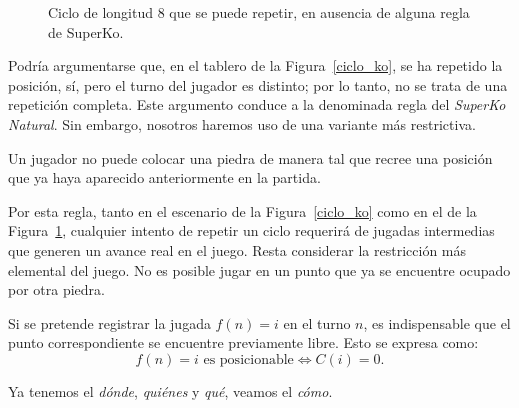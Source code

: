 \begin{figure}[H]
	\caption{Ciclo de longitud 8 que se puede repetir, en ausencia de alguna regla de SuperKo.}
	\label{ciclo_inf}
\end{figure}
Podría argumentarse que, en el tablero de la Figura~\ref{ciclo_ko}, se ha repetido la posición, sí, pero el turno del jugador es distinto; por lo tanto, no se trata de una repetición completa. Este argumento conduce a la denominada regla del \textit{SuperKo Natural}. Sin embargo, nosotros haremos uso de una variante más restrictiva.
\begin{definition}\label{sec-superko}
	Un jugador no puede colocar una piedra de manera tal que recree una posición que ya haya aparecido anteriormente en la partida.
\end{definition}

Por esta regla, tanto en el escenario de la Figura~\ref{ciclo_ko} como en el de la Figura~\ref{ciclo_inf}, cualquier intento de repetir un ciclo requerirá de jugadas intermedias que generen un avance real en el juego. Resta considerar la restricción más elemental del juego. No es posible jugar en un punto que ya se encuentre ocupado por otra piedra.

\begin{definition}
	Si se pretende registrar la jugada $f(n) = i$ en el turno $n$, es indispensable que el punto correspondiente se encuentre previamente libre. Esto se expresa como:
	\[f(n) = i \text{ es posicionable} \iff C(i) = 0.\]
\end{definition}
Ya tenemos el \textit{dónde}, \textit{quiénes} y \textit{qué}, veamos el \textit{cómo}. 

